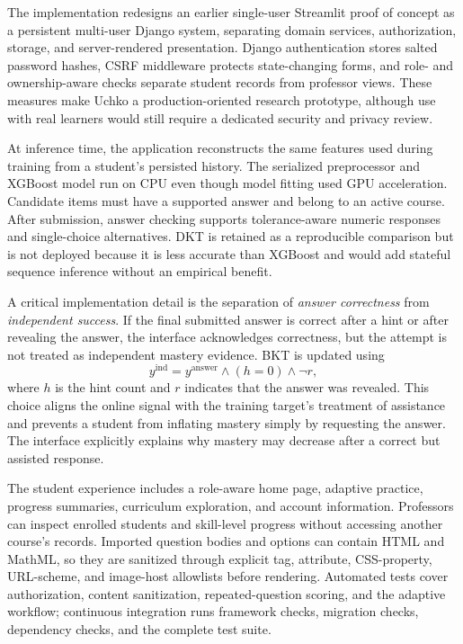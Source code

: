 \documentclass[conference]{IEEEtran}
\begin{document}
The implementation redesigns an earlier single-user Streamlit proof of concept as a persistent multi-user Django system, separating domain services, authorization, storage, and server-rendered presentation. Django authentication stores salted password hashes, CSRF middleware protects state-changing forms, and role- and ownership-aware checks separate student records from professor views. These measures make Uchko a production-oriented research prototype, although use with real learners would still require a dedicated security and privacy review.

At inference time, the application reconstructs the same features used during training from a student's persisted history. The serialized preprocessor and XGBoost model run on CPU even though model fitting used GPU acceleration. Candidate items must have a supported answer and belong to an active course. After submission, answer checking supports tolerance-aware numeric responses and single-choice alternatives. DKT is retained as a reproducible comparison but is not deployed because it is less accurate than XGBoost and would add stateful sequence inference without an empirical benefit.

A critical implementation detail is the separation of \emph{answer correctness} from \emph{independent success}. If the final submitted answer is correct after a hint or after revealing the answer, the interface acknowledges correctness, but the attempt is not treated as independent mastery evidence. BKT is updated using
\begin{equation}
y^{\mathrm{ind}}=y^{\mathrm{answer}}\land(h=0)\land\neg r,
\end{equation}
where $h$ is the hint count and $r$ indicates that the answer was revealed. This choice aligns the online signal with the training target's treatment of assistance and prevents a student from inflating mastery simply by requesting the answer. The interface explicitly explains why mastery may decrease after a correct but assisted response.

The student experience includes a role-aware home page, adaptive practice, progress summaries, curriculum exploration, and account information. Professors can inspect enrolled students and skill-level progress without accessing another course's records. Imported question bodies and options can contain HTML and MathML, so they are sanitized through explicit tag, attribute, CSS-property, URL-scheme, and image-host allowlists before rendering. Automated tests cover authorization, content sanitization, repeated-question scoring, and the adaptive workflow; continuous integration runs framework checks, migration checks, dependency checks, and the complete test suite.
\end{document}
